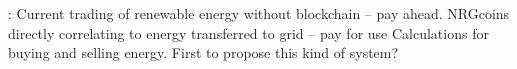 


\cite{NRGcoin_Mihaylov} : Current trading of renewable energy without blockchain – pay ahead. NRGcoins directly correlating to energy transferred to grid – pay for use Calculations for buying and selling energy. First to propose this kind of system?



